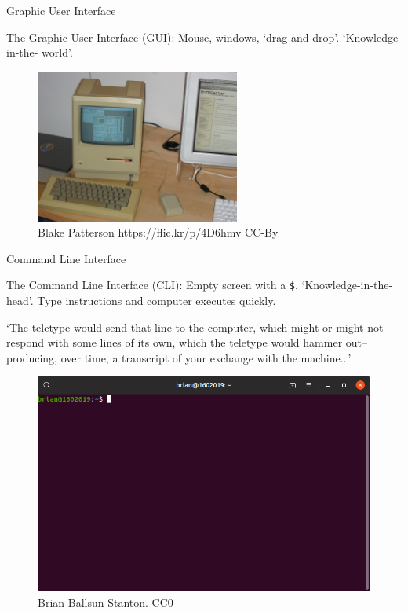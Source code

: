 \documentclass[aspectratio=1610, 11pt]{beamer} %
\begin{document}
\begin{frame}{Graphic User Interface}
    
   The Graphic User Interface (GUI): Mouse, windows, `drag and drop'. `Knowledge-in-the- world'. \cite{Norman2013-xk}
    \begin{figure}[H]
        
        \includegraphics[width=0.6\textwidth]{figures/2388811229_7e3a50354d_b_d.jpg}
        \caption{Blake Patterson https://flic.kr/p/4D6hmv CC-By}
        \label{fig:gui}
    \end{figure}
   
\end{frame}

\begin{frame}{Command Line Interface}

    The Command Line Interface (CLI): Empty screen with a {\tt \$}. `Knowledge-in-the-head'\cite{Norman2013-xk}. Type instructions and computer executes quickly.

`The teletype would send that line to
the computer, which might or might not respond with some lines of its own, which the
teletype would hammer out–producing, over time, a transcript of your exchange with
the machine...' \cite{Stephenson1999-fw}

    
     \begin{figure}[H]

     \includegraphics[width=.3\textwidth]{figures/terminal.png}
        \caption{Brian Ballsun-Stanton. CC0}
        \label{fig:cli}
        \end{figure}

\end{frame}
\end{document}

